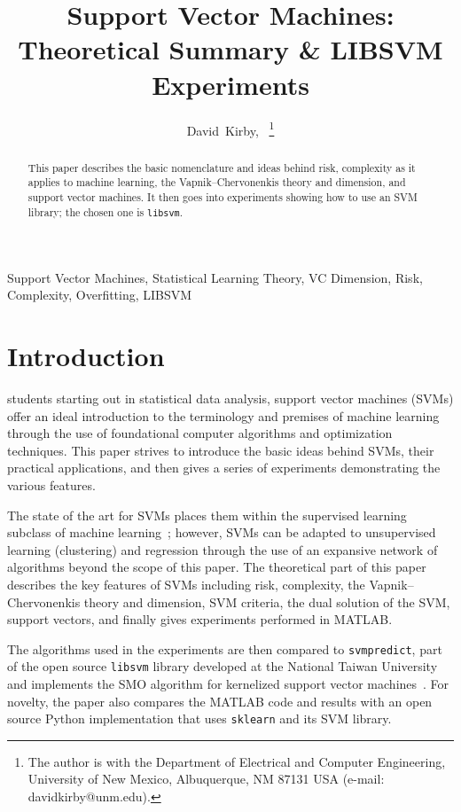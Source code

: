 \documentclass[journal]{IEEEtran}
\begin{document}
\title{Support Vector Machines: Theoretical Summary \& LIBSVM Experiments}%

\author{David~Kirby,~%
\thanks{The author is with the Department of Electrical and Computer Engineering, University of New Mexico, Albuquerque, NM 87131 USA (e-mail: davidkirby@unm.edu).}%
}

\maketitle
\begin{abstract}
    This paper describes the basic nomenclature and ideas behind risk, complexity as it applies to machine learning, the Vapnik--Chervonenkis theory and dimension, and support vector machines. It then goes into experiments showing how to use an SVM library; the chosen one is \texttt{libsvm}.
\end{abstract}
\begin{IEEEkeywords}
    Support Vector Machines, Statistical Learning Theory, VC Dimension, Risk, Complexity, Overfitting, LIBSVM
\end{IEEEkeywords}

\section{Introduction}

 students starting out in statistical data analysis, support vector machines (SVMs) offer an ideal introduction to the terminology and premises of machine learning through the use of foundational computer algorithms and optimization techniques. This paper strives to introduce the basic ideas behind SVMs, their practical applications, and then gives a series of experiments demonstrating the various features.

The state of the art for SVMs places them within the supervised learning subclass of machine learning~\cite{TDS}; however, SVMs can be adapted to unsupervised learning (clustering) and regression through the use of an expansive network of algorithms beyond the scope of this paper. The theoretical part of this paper describes the key features of SVMs including risk, complexity, the Vapnik–Chervonenkis theory and dimension, SVM criteria, the dual solution of the SVM, support vectors, and finally gives experiments performed in MATLAB. 

The algorithms used in the experiments are then compared to \texttt{svmpredict}, part of the open source \texttt{libsvm} library developed at the National Taiwan University and implements the SMO algorithm for kernelized support vector machines~\cite{LIBSVM}. For novelty, the paper also compares the MATLAB code and results with an open source Python implementation that uses \texttt{sklearn} and its SVM library.
\end{document}
